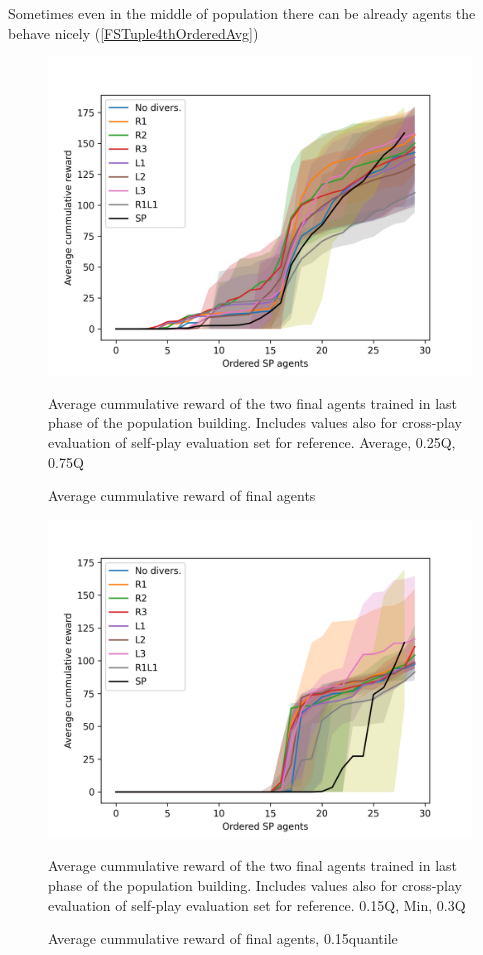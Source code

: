 Sometimes even in the middle of population there can be already agents the behave nicely (\ref{FSTuple4thOrderedAvg})

\begin{figure}[!ht]
    \centering
    \includegraphics*[width=13cm]{../img/SimpleCNNOrderedAvg.png}

    \caption{Average cummulative reward of final agents}
    \label{SimpleCNNOrderedAvg}
    \medskip
    \small 
    Average cummulative reward of the two final agents trained in last phase of the population building.
    Includes values also for cross-play evaluation of self-play evaluation set for reference. 
    Average, 0.25Q, 0.75Q

\end{figure}

\begin{figure}[!ht]
    \centering
    \includegraphics*[width=13cm]{../img/SimpleCNNOrderedAvg0.15Q.png}

    \caption{Average cummulative reward of final agents, 0.15quantile}
    \label{SimpleCNNOrderedAvg0.15Q}
    \medskip
    \small 
    Average cummulative reward of the two final agents trained in last phase of the population building.
    Includes values also for cross-play evaluation of self-play evaluation set for reference. 
    0.15Q, Min, 0.3Q

\end{figure}


